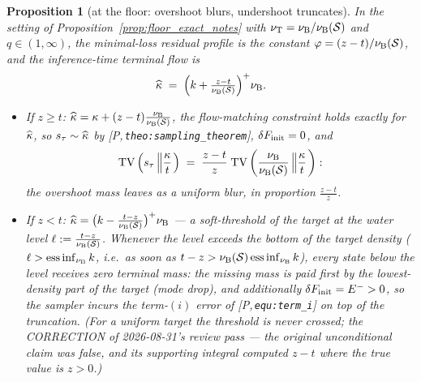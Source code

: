\documentclass[11pt]{article}
\newtheorem{proposition}[theorem]{Proposition}
\theoremstyle{definition}
\theoremstyle{remark}
\newcommand{\paperref}[1]{[P,\,\texttt{#1}]}   %
\begin{document}
\begin{proposition}[at the floor: overshoot blurs, undershoot truncates]
\label{prop:blur_vs_drop_notes}
In the setting of Proposition~\ref{prop:floor_exact_notes} with $\nu_{\mathrm{T}}=\nu_{\mathrm{B}}/\nu_{\mathrm{B}}(\mathcal S)$
and $q\in(1,\infty)$, the minimal-loss residual profile is the constant
$\varphi=(z-t)/\nu_{\mathrm{B}}(\mathcal S)$, and the inference-time terminal flow is
\begin{equation*}
    \widehat{\kappa} \;=\;\Bigl(k+\tfrac{z-t}{\nu_{\mathrm{B}}(\mathcal S)}\Bigr)^{+}\nu_{\mathrm{B}} .
\end{equation*}
\begin{itemize}
    \item If $z\geq t$: $\widehat{\kappa}=\kappa+(z-t)\frac{\nu_{\mathrm{B}}}{\nu_{\mathrm{B}}(\mathcal S)}$,
    the flow-matching constraint holds \emph{exactly} for $\widehat{\kappa}$, so
    $s_\tau\sim\widehat{\kappa}$ by \paperref{theo:sampling\_theorem}, $\delta F_{\mathrm{init}}=0$, and
    \begin{equation}\label{equ:blur_notes}
        \mathrm{TV}\left(s_\tau\left\|\frac{\kappa} t\right.\right)
        \;=\;\frac{z-t}{z}\;\mathrm{TV}\left(\frac{\nu_{\mathrm{B}}}{\nu_{\mathrm{B}}(\mathcal S)}
        \left\|\frac{\kappa} t\right.\right):
    \end{equation}
    the overshoot mass leaves as a uniform blur, in proportion $\frac{z-t}{z}$.
    \item If $z<t$: $\widehat{\kappa}=\bigl(k-\tfrac{t-z}{\nu_{\mathrm{B}}(\mathcal S)}\bigr)^+\nu_{\mathrm{B}}$
    --- a soft-threshold of the target at the water level
    $\ell:=\frac{t-z}{\nu_{\mathrm{B}}(\mathcal S)}$. Whenever the level exceeds the bottom of
    the target density ($\ell>\operatorname*{ess\,inf}_{\nu_{\mathrm{B}}} k$, i.e.\ as soon as
    $t-z>\nu_{\mathrm{B}}(\mathcal S)\operatorname*{ess\,inf}_{\nu_{\mathrm{B}}} k$), every state below
    the level receives \emph{zero} terminal mass: the missing mass is paid first by the
    lowest-density part of the target (mode drop), and additionally
    $\delta F_{\mathrm{init}}=E^->0$, so the sampler incurs the term-$(i)$ error of
    \paperref{equ:term\_i} on top of the truncation. (For a uniform target the
    threshold is never crossed; the CORRECTION of 2026-08-31's review pass --- the
    original unconditional claim was false, and its supporting integral computed
    $z-t$ where the true value is $z>0$.)
\end{itemize}
\end{proposition}
\end{document}
